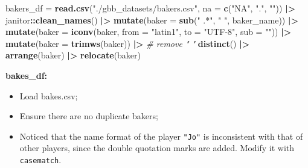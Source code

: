 \documentclass[
]{article}
\newenvironment{Shaded}{\begin{snugshade}}{\end{snugshade}}
\newcommand{\AttributeTok}[1]{\textcolor[rgb]{0.13,0.29,0.53}{#1}}
\newcommand{\CommentTok}[1]{\textcolor[rgb]{0.56,0.35,0.01}{\textit{#1}}}
\newcommand{\FunctionTok}[1]{\textcolor[rgb]{0.13,0.29,0.53}{\textbf{#1}}}
\newcommand{\NormalTok}[1]{#1}
\newcommand{\OtherTok}[1]{\textcolor[rgb]{0.56,0.35,0.01}{#1}}
\newcommand{\SpecialCharTok}[1]{\textcolor[rgb]{0.81,0.36,0.00}{\textbf{#1}}}
\newcommand{\StringTok}[1]{\textcolor[rgb]{0.31,0.60,0.02}{#1}}
\begin{document}
\begin{Shaded}
\begin{Highlighting}[]
\NormalTok{bakers\_df }\OtherTok{=} \FunctionTok{read.csv}\NormalTok{(}\StringTok{"./gbb\_datasets/bakers.csv"}\NormalTok{, }
                     \AttributeTok{na =} \FunctionTok{c}\NormalTok{(}\StringTok{"NA"}\NormalTok{, }\StringTok{"."}\NormalTok{, }\StringTok{""}\NormalTok{)) }\SpecialCharTok{|\textgreater{}}
\NormalTok{  janitor}\SpecialCharTok{::}\FunctionTok{clean\_names}\NormalTok{() }\SpecialCharTok{|\textgreater{}}
  \FunctionTok{mutate}\NormalTok{(}\AttributeTok{baker =} \FunctionTok{sub}\NormalTok{(}\StringTok{" .*"}\NormalTok{, }\StringTok{" "}\NormalTok{, baker\_name)) }\SpecialCharTok{|\textgreater{}}
  \FunctionTok{mutate}\NormalTok{(}\AttributeTok{baker =} \FunctionTok{iconv}\NormalTok{(baker, }\AttributeTok{from =} \StringTok{"latin1"}\NormalTok{, }\AttributeTok{to =} \StringTok{"UTF{-}8"}\NormalTok{, }\AttributeTok{sub =} \StringTok{""}\NormalTok{)) }\SpecialCharTok{|\textgreater{}}
  \FunctionTok{mutate}\NormalTok{(}\AttributeTok{baker =} \FunctionTok{trimws}\NormalTok{(baker)) }\SpecialCharTok{|\textgreater{}} \CommentTok{\# remove " "}
  \FunctionTok{distinct}\NormalTok{() }\SpecialCharTok{|\textgreater{}}
  \FunctionTok{arrange}\NormalTok{(baker) }\SpecialCharTok{|\textgreater{}}
  \FunctionTok{relocate}\NormalTok{(baker)}
\end{Highlighting}
\end{Shaded}

\textbf{bakes\_df:}

\begin{itemize}
\item
  Load bakes.csv;
\item
  Ensure there are no duplicate bakers;
\item
  Noticed that the name format of the player \texttt{"Jo"} is
  inconsistent with that of other players, since the double quotation
  marks are added. Modify it with \texttt{casematch}.
\end{itemize}
\end{document}
